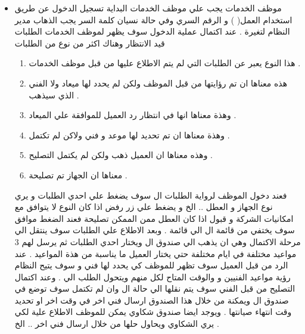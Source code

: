 \documentclass[25pt]{article}
\begin{document}
\begin{itemize}
	\item موظف الخدمات
	\newline
		يجب علي موظف الخدمات البداية تسجيل الدخول عن طريق استخدام                العمل( ) و الرقم السري وفي حالة نسيان كلمة السر يجب الذهاب مدير النظام لتغيرة .
	\newline
	عند اكتمال عملية الدخول سوف يظهر لموظف الخدمات الطلبات قيد الانتظار وهناك اكثر من نوع من الطلبات 
	\begin{enumerate}
		\item{} هذا النوع يعبر عن الطلبات التي لم يتم الاطلاع عليها من قبل موظف الخدمات .
		\item{} هذه معناها ان تم رؤايتها من قبل الموظف ولكن لم يحدد لها ميعاد ولا الفني الذي سيذهب .
		\item{} وهذة معناها انها في انتظار رد العميل للموافقة علي الميعاد .
		\item{} وهذة معناها ان تم تحديد لها موعد و فني ولاكن لم تكتمل .
		\item{} وهذه معناها ان العميل ذهب ولكن لم يكتمل التصليح .
		\item{} معناها ان الجهاز تم تصليحة .
		\newline
	\end{enumerate}
		 فعند دخول الموظف لرواية الطلبات ال  سوف يضغط علي احدي الطلبات و يري نوع الجهاز و العطل  .. الخ و يضغط علي زر رفض اذا كان النوع لا يتوافق مع امكانيات الشركة و قبول اذا كان العطل ممن الممكن تصليحة فعند الضغط موافق سوف يختفي من قائمة ال  الي قائمة  .
		 \newline
		 وبعد الاطلاع علي الطلبات سوف ينتقل الي مرحلة الاكتمال وهي ان يذهب الي صندوق ال  ويختار احدي الطلبات ثم يرسل لهم 3 مواعيد مختلفة في ايام مختلفة حتي يختار العميل ما يناسبة من هذة المواعيد .
		 \newline
		 عند الرد من قبل العميل سوف تظهر للموظف كي يحدد لها فني و سوف يتيح النظام رؤية مواعيد الفنيين و والوقت المتاح لكل منهم ويتحول الطلب الي  .
		 \newline
		 وعند اكتمال التصليح من قبل الفني سوف يتم نقلها الي حالة ال  وان لم تكتمل سوف توضع في صندوق ال  ويمكنة من خلال هذا الصندوق ارسال فني اخر في وقت اخر او تحديد وقت انتهاء صيانتها .
		 \newline
		 ويوجد ايضا صندوق شكاوي يمكن للموظف الاطلاع علية لكي يري الشكاوي ويحاول حلها من خلال ارسال فني اخر .. الخ .
		 \newline

\end{itemize}
\end{document}

